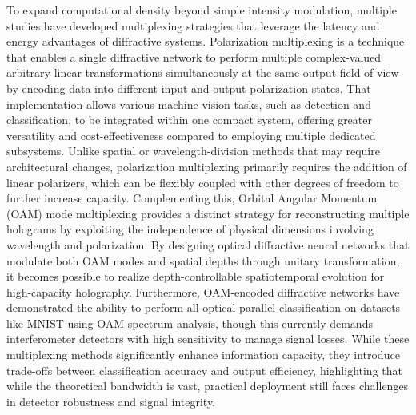 \documentclass[11pt]{article}
\begin{document}
To expand computational density beyond simple intensity modulation, multiple studies have developed multiplexing strategies that leverage the latency and energy advantages of diffractive systems. Polarization multiplexing is a technique that enables a single diffractive network to perform multiple complex-valued arbitrary linear transformations simultaneously at the same output field of view by encoding data into different input and output polarization states. \citep{doi_10_1038_s41377_022_00849_x_e31226af} That implementation allows various machine vision tasks, such as detection and classification, to be integrated within one compact system, offering greater versatility and cost-effectiveness compared to employing multiple dedicated subsystems. Unlike spatial or wavelength-division methods that may require architectural changes, polarization multiplexing primarily requires the addition of linear polarizers, which can be flexibly coupled with other degrees of freedom to further increase capacity. Complementing this, Orbital Angular Momentum (OAM) mode multiplexing provides a distinct strategy for reconstructing multiple holograms by exploiting the independence of physical dimensions involving wavelength and polarization. By designing optical diffractive neural networks that modulate both OAM modes and spatial depths through unitary transformation, it becomes possible to realize depth-controllable spatiotemporal evolution for high-capacity holography. Furthermore, OAM-encoded diffractive networks have demonstrated the ability to perform all-optical parallel classification on datasets like MNIST using OAM spectrum analysis, though this currently demands interferometer detectors with high sensitivity to manage signal losses. While these multiplexing methods significantly enhance information capacity, they introduce trade-offs between classification accuracy and output efficiency, highlighting that while the theoretical bandwidth is vast, practical deployment still faces challenges in detector robustness and signal integrity. \citep{doi_10_1038_s41377_022_00849_x_e31226af} \citep{doi_10_1364_oe_447337_61ffab71} \citep{doi_10_1117_1_apn_2_6_066006_d88755f0}
\end{document}
